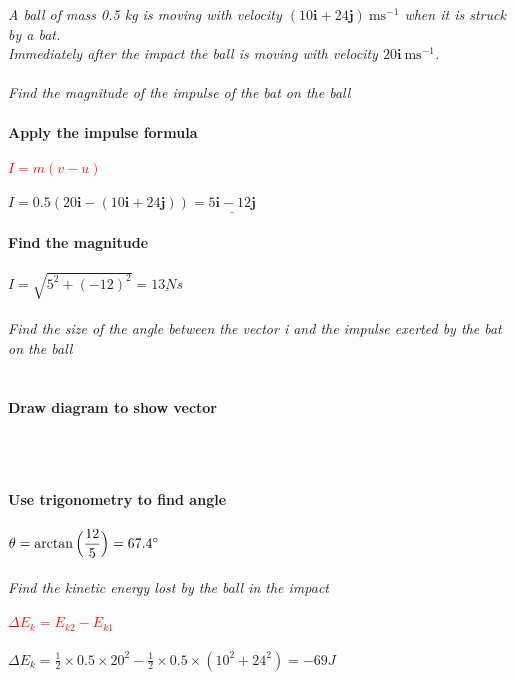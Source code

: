 \documentclass{article}[18pt]
\begin{document}
\textit{A ball of mass 0.5 kg is moving with velocity $(10\mathbf{i} + 24\mathbf{j}) \ \text{ms}^{-1}$ when it is struck by a bat.\\
Immediately after the impact the ball is moving with velocity $20\mathbf{i} \ \text{ms}^{-1}$. }
\\
\\
\textit{Find the magnitude of the impulse of the bat on the ball}\\
\\
\textbf{Apply the impulse formula}\\
\\
\textcolor{red}{$I=m(v-u)$}\\
\\
$I=0.5(20\mathbf{i}-(10\mathbf{i}+24\mathbf{j}))=\underline{5\mathbf{i}-12\mathbf{j}}$\\
\\
\textbf{Find the magnitude}\\
\\
$I=\sqrt{5^2+(-12)^2}=\underline{13Ns}$\\
\\
\textit{Find the size of the angle between the vector i and the impulse exerted by the bat on the ball}\\
\\
\\
\textbf{Draw diagram to show vector}\\
\\
\\
\\
\textbf{Use trigonometry to find angle}\\
\\
$\theta=\arctan\Big(\dfrac{12}{5}\Big)=67.4\degree$\\
\\
\textit{Find the kinetic energy lost by the ball in the impact}\\
\\
\textcolor{red}{$\Delta E_k=E_{k2}-E_{k1}$}\\
\\
$\Delta E_k=\frac{1}{2}\times0.5\times20^2-\frac{1}{2}\times0.5\times(10^2+24^2)=-69J$
\end{document}
